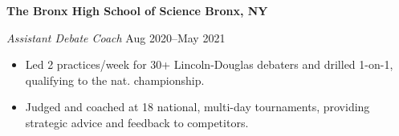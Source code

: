 \textbf{The Bronx High School of Science \hfill Bronx, NY} \par
\textit{Assistant Debate Coach}  \hfill Aug 2020--May 2021
\begin{itemize}
	\item Led 2 practices/week for 30+ Lincoln-Douglas debaters and drilled 1-on-1, qualifying to the nat. championship. 
	\item Judged and coached at 18 national, multi-day tournaments, providing strategic advice and feedback to competitors.
\end{itemize}\par